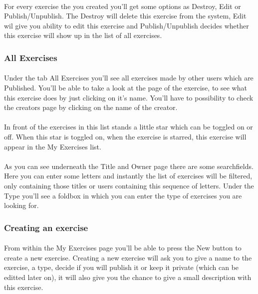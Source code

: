\documentclass[11pt,a4paper]{scrartcl}
\begin{document}
\paragraph{}For every exercise the you created you'll get some options as Destroy, Edit or Publish/Unpublish. The Destroy will delete this exercise from the system, Edit wil give you ability to edit this exercise and Publish/Unpublish decides whether this exercise will show up in the list of all exercises.
\subsubsection{All Exercises}
\paragraph{}Under the tab All Exercises you'll see all exercises made by other users which are Published. You'll be able to take a look at the page of the exercise, to see what this exercise does by just clicking on it's name. You'll have to possibility to check the creators page by clicking on the name of the creator.
\paragraph{}In front of the exercises in this list stands a little star which can be toggled on or off. When this star is toggled on, when the exercise is starred, this exercise will appear in the My Exercises list.
\paragraph{}As you can see underneath the Title and Owner page there are some searchfields. Here you can enter some letters and instantly the list of exercises will be filtered, only containing those titles or users containing this sequence of letters. Under the Type you'll see a foldbox in which you can enter the type of exercises you are looking for.

\subsubsection{Creating an exercise}
\paragraph{}From within the My Exercises page you'll be able to press the New button to create a new exercise. Creating a new exercise will ask you to give a name to the exercise, a type, decide if you will publish it or keep it private (which can be editted later on), it will also give you the chance to give a small description with this exercise.
\end{document}
